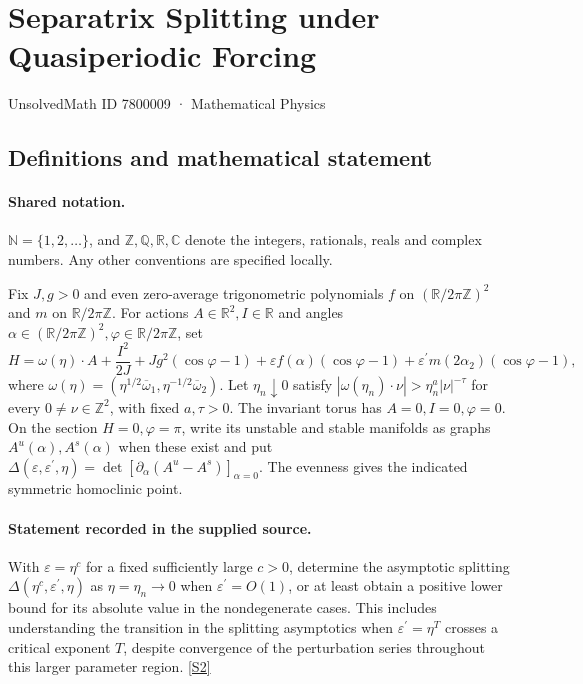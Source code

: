 \documentclass[11pt]{article}
\newcommand{\sref}[2]{\hyperlink{source:#1:#2}{[S#2]}}
\begin{document}
\setcounter{section}{7800008}
\section{Separatrix Splitting under Quasiperiodic Forcing}\label{7800009}
{\small\sffamily UnsolvedMath ID 7800009 · Mathematical Physics}
\subsection{Definitions and mathematical statement}

\paragraph{Shared notation.}$\mathbb N=\{1,2,\ldots\}$, and $\mathbb Z,\mathbb Q,\mathbb R,\mathbb C$ denote the integers, rationals, reals and complex numbers. Any other conventions are specified locally.


Fix $J,g>0$ and even zero-average trigonometric polynomials $f$ on $(\mathbb R/2\pi\mathbb Z)^2$ and $m$ on $\mathbb R/2\pi\mathbb Z$. For actions $A\in\mathbb R^2,I\in\mathbb R$ and angles $\alpha\in(\mathbb R/2\pi\mathbb Z)^2,\varphi\in\mathbb R/2\pi\mathbb Z$, set \[H=\omega(\eta)\cdot A+\frac{I^2}{2J}+Jg^2(\cos\varphi-1)+\varepsilon f(\alpha)(\cos\varphi-1)+\varepsilon^{\prime}m(2\alpha_2)(\cos\varphi-1),\] where $\omega(\eta)=(\eta^{1/2}\overline\omega_1,\eta^{-1/2}\overline\omega_2)$. Let $\eta_n\downarrow0$ satisfy $|\omega(\eta_n)\cdot\nu|>\eta_n^a|\nu|^{-\tau}$ for every $0\ne\nu\in\mathbb Z^2$, with fixed $a,\tau>0$. The invariant torus has $A=0,I=0,\varphi=0$. On the section $H=0,\varphi=\pi$, write its unstable and stable manifolds as graphs $A^u(\alpha),A^s(\alpha)$ when these exist and put $\Delta(\varepsilon,\varepsilon^{\prime},\eta)=\det[\partial_\alpha(A^u-A^s)]_{\alpha=0}$. The evenness gives the indicated symmetric homoclinic point.
\paragraph{Statement recorded in the supplied source.}
With $\varepsilon=\eta^c$ for a fixed sufficiently large $c>0$, determine the asymptotic splitting $\Delta(\eta^c,\varepsilon^{\prime},\eta)$ as $\eta=\eta_n\to0$ when $\varepsilon^{\prime}=O(1)$, or at least obtain a positive lower bound for its absolute value in the nondegenerate cases. This includes understanding the transition in the splitting asymptotics when $\varepsilon^{\prime}=\eta^T$ crosses a critical exponent $T$, despite convergence of the perturbation series throughout this larger parameter region. \sref{7800009}{2}
\end{document}
